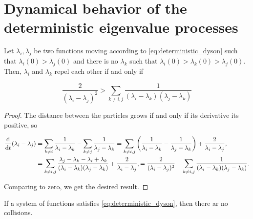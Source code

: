 \section{Dynamical behavior of the deterministic eigenvalue processes}

\begin{lemma} \label{lemma:separation}
    Let $\lambda_i,\lambda_j$ be two functions moving according to \eqref{eq:deterministic_dyson} such that $\lambda_i(0) > \lambda_j(0)$ and there is no $\lambda_k$ such that $\lambda_i(0) > \lambda_k(0) > \lambda_j(0)$. Then, $\lambda_i$ and $\lambda_k$ repel each other if and only if 

    \begin{equation} \label{eq:separation_condition}
        \frac{2}{(\lambda_i - \lambda_j)^2} > \sum_{k\neq i,j} \frac{1}{(\lambda_i - \lambda_k)(\lambda_j - \lambda_k)}
    \end{equation}
\end{lemma}

\begin{proof}

    The distance between the particles grows if and only if its derivative its positive, so 

    \begin{align*}
        \frac{\mathrm d }{\mathrm d t} (\lambda_i - \lambda_j) &= \sum_{k\neq i} \frac{1}{\lambda_i - \lambda_k} - \sum_{k\neq j} \frac{1}{\lambda_j - \lambda_k} = \sum_{k\neq i,j} \left( \frac{1}{\lambda_i - \lambda_k} - \frac{1}{\lambda_j - \lambda_k} \right) + \frac{2}{\lambda_i - \lambda_j},\\
        &= \sum_{k \neq i, j} \frac{\lambda_j - \lambda_k - \lambda_i + \lambda_k}{(\lambda_i- \lambda_k)(\lambda_j - \lambda_k)} + \frac{2}{\lambda_i - \lambda_j},= \frac{2}{(\lambda_i - \lambda_j)^2} - \sum_{k\neq i,j} \frac{1}{(\lambda_i - \lambda_k)(\lambda_j - \lambda_k)}.
    \end{align*}

    Comparing to zero, we get the desired result.
\end{proof}

\begin{theorem}
    If a system of functions satisfies \eqref{eq:deterministic_dyson}, then there ar no collisions.
\end{theorem}


